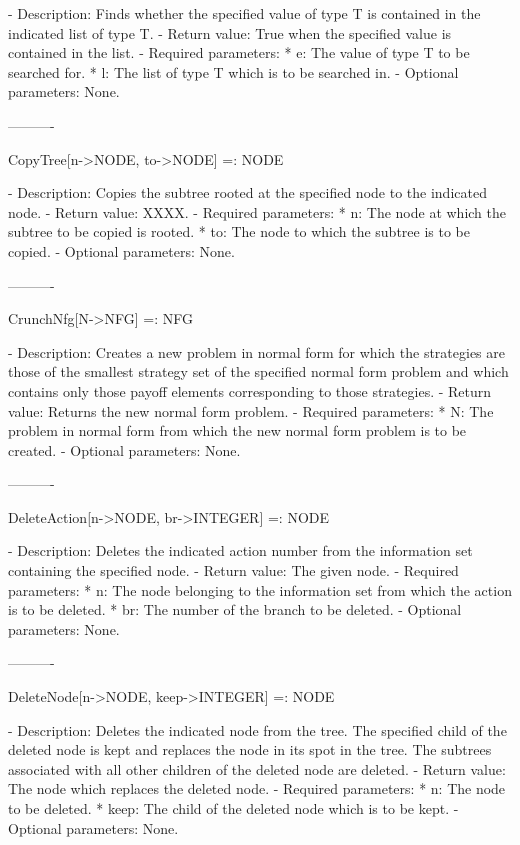 {   -	Description:  Finds whether the specified value of type T is contained 
	in the indicated list of type T.
   -	Return value:  True when the specified value is contained in the list.
   -	Required parameters:
	  *  e:  The value of type T to be searched for.
	  *  l:  The list of type T which is to be searched in.
   -	Optional parameters:  None.

----------

CopyTree[n->NODE, to->NODE] =: NODE

   -	Description:  Copies the subtree rooted at the specified node to the 
	indicated node.
   -	Return value:  XXXX.
   -	Required parameters:
	  *  n:  The node at which the subtree to be copied is rooted.
	  *  to:  The node to which the subtree is to be copied.
   -	Optional parameters:  None.

----------

CrunchNfg[N->NFG] =: NFG

   -	Description:  Creates a new problem in normal form for which the 
	strategies are those of the smallest strategy set of the specified 
	normal form problem and which contains only those payoff elements
	corresponding to those strategies.
   -	Return value:  Returns the new normal form problem.
   -	Required parameters:
	  *  N:  The problem in normal form from which the new normal form 
		problem is to be created.
   -	Optional parameters:  None.

----------

DeleteAction[n->NODE, br->INTEGER] =: NODE

   -	Description:  Deletes the indicated action number from the information
	set containing the specified node.
   -	Return value:  The given node.
   -	Required parameters:
	  *  n:  The node belonging to the information set from which the 
		action is to be deleted.
	  *  br:  The number of the branch to be deleted.
   -	Optional parameters:  None.

----------

DeleteNode[n->NODE, keep->INTEGER] =: NODE

   -	Description:  Deletes the indicated node from the tree.  The specified
	child of the deleted node is kept and replaces the node in its spot in
	the tree.  The subtrees associated with all other children of the 
	deleted node are deleted.
   -	Return value:  The node which replaces the deleted node.
   -	Required parameters:
	  *  n:  The node to be deleted.
	  *  keep:  The child of the deleted node which is to be kept.
   -	Optional parameters:  None.

}
